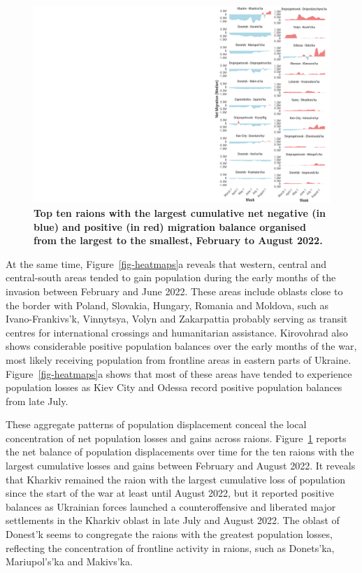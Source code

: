 \documentclass[
  sn-nature,
  11pt,
]{sn-jnl}
\begin{document}
\begin{figure}

\begin{minipage}{\linewidth}

\includegraphics[width=\linewidth,height=1\textheight,keepaspectratio]{../outputs/2_2/fig2-two-partsb.pdf}

\end{minipage}%

\caption{\label{fig-heatmaps2}\textbf{Top ten raions with the largest
cumulative net negative (in blue) and positive (in red) migration
balance organised from the largest to the smallest, February to August
2022.}}

\end{figure}%

At the same time, Figure~\ref{fig-heatmaps}a reveals that western,
central and central-south areas tended to gain population during the
early months of the invasion between February and June 2022. These areas
include oblasts close to the border with Poland, Slovakia, Hungary,
Romania and Moldova, such as Ivano-Frankivs'k, Vinnytsya, Volyn and
Zakarpattia probably serving as transit centres for international
crossings and humanitarian assistance. Kirovohrad also shows
considerable positive population balances over the early months of the
war, most likely receiving population from frontline areas in eastern
parts of Ukraine. Figure~\ref{fig-heatmaps}a shows that most of these
areas have tended to experience population losses as Kiev City and
Odessa record positive population balances from late July.

These aggregate patterns of population displacement conceal the local
concentration of net population losses and gains across raions.
Figure~\ref{fig-heatmaps2} reports the net balance of population
displacements over time for the ten raions with the largest cumulative
losses and gains between February and August 2022. It reveals that
Kharkiv remained the raion with the largest cumulative loss of
population since the start of the war at least until August 2022, but it
reported positive balances as Ukrainian forces launched a
counteroffensive and liberated major settlements in the Kharkiv oblast
in late July and August 2022. The oblast of Donest'k seems to congregate
the raions with the greatest population losses, reflecting the
concentration of frontline activity in raions, such as Donets'ka,
Mariupol's'ka and Makivs'ka.
\end{document}
